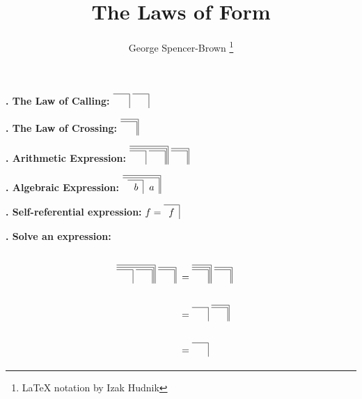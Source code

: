 \documentclass[12pt, letterpaper]{article}
\title{The Laws of Form}
\author{George Spencer-Brown \thanks{\LaTeX{} notation by Izak Hudnik}}
\newcommand\CROSS[1]{%
  \hbox{%
    \vbox{
      \hrule
      \kern2pt
      \hbox{$#1$ \strut \kern-5pt }
    }%
  \vrule
  }\mskip\thickmuskip
}
\newcommand\CROSSALGEBRAIC[1]{%
  \hbox{%
    \vbox{
      \hrule
      \kern2pt
      \hbox{\,\,\,$#1$ \! \strut}
    }%
  \vrule
  }\mskip\thickmuskip
}
\newcommand\CROSSEMPTY[0]{%
  \hbox{%
    \vbox{
      \hrule
      \kern2pt
      \hbox{ \, \, \! \! \strut}
    }%
  \vrule
  }\mskip\thickmuskip
}
\begin{document}
\maketitle

\textbf{
. The Law of Calling:\quad}
\( \CROSSEMPTY \CROSSEMPTY \)

\textbf{
\newline{}. The Law of Crossing:\quad}
\( \CROSS{ \CROSSEMPTY } \)


\textbf{
\newline{}. Arithmetic Expression:\quad}
\(  \CROSS{ \CROSS{ \CROSSEMPTY \CROSSEMPTY } } \CROSS{\CROSSEMPTY} \)

\textbf{
\newline{}. Algebraic Expression:\quad}
\( \CROSS{ \CROSSALGEBRAIC{ \CROSSALGEBRAIC{ \, b  } \, \, a } } \)

\textbf{
\newline{}. Self-referential expression:\quad}
\( f = \CROSSALGEBRAIC{f} \)

\textbf{
\newline{}. Solve an expression:\quad}
\begin{align*}
\\ \CROSS{ \CROSS{ \CROSSEMPTY \CROSSEMPTY } } \CROSS{\CROSSEMPTY} &= \CROSS{ \CROSS{ \CROSSEMPTY } } \CROSS{\CROSSEMPTY} \\[3pt]
\\ &= \CROSSEMPTY \CROSS{\CROSSEMPTY} \\[3pt]
\\ &= \CROSSEMPTY \\[3pt]
\end{align*} 
\end{document}

